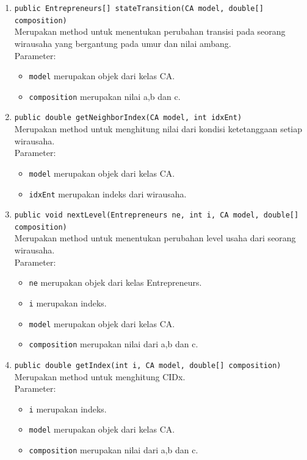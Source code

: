 		\begin{enumerate}
			\item \texttt{public Entrepreneurs[] stateTransition(CA model, double[] composition)}\\
			Merupakan method untuk menentukan perubahan transisi pada seorang wirausaha yang bergantung pada umur dan nilai ambang.\\			Parameter:
			\begin{itemize}
				\item \texttt{model} merupakan objek dari kelas CA.
				\item \texttt{composition} merupakan nilai a,b dan c.
			\end{itemize}
			
			\item \texttt{public double getNeighborIndex(CA model, int idxEnt)}\\
			Merupakan method untuk menghitung nilai dari kondisi ketetanggaan setiap wirausaha.\\
			Parameter:
			\begin{itemize}
				\item \texttt{model} merupakan objek dari kelas CA.
				\item \texttt{idxEnt} merupakan indeks dari wirausaha.
			\end{itemize}
		
			\item \texttt{public void nextLevel(Entrepreneurs ne, int i, CA model, double[] composition)}\\
			Merupakan method untuk menentukan perubahan level usaha dari seorang wirausaha.\\
			Parameter:
			\begin{itemize}
				\item \texttt{ne} merupakan objek dari kelas Entrepreneurs.
				\item \texttt{i} merupakan indeks.
				\item \texttt{model} merupakan objek dari kelas CA.
				\item \texttt{composition} merupakan nilai dari a,b dan c.
			\end{itemize}
			
			\item \texttt{public double getIndex(int i, CA model, double[] composition)}\\
			Merupakan method untuk menghitung CIDx.\\
			Parameter:
			\begin{itemize}
				\item \texttt{i} merupakan indeks.
				\item \texttt{model} merupakan objek dari kelas CA.
				\item \texttt{composition} merupakan nilai dari a,b dan c.
			\end{itemize}
			

\end{enumerate}
